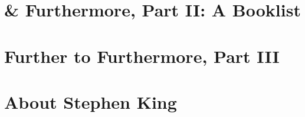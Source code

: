 \documentclass{article}
\numberwithin{equation}{section}
\begin{document}
\section{\& Furthermore, Part II: A Booklist}


\section{Further to Furthermore, Part III}


\section{About Stephen King}


\printbibliography[heading=bibintoc]
	
\end{document}
